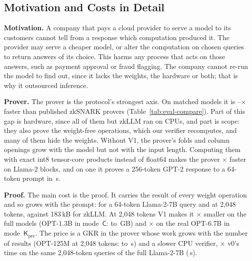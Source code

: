 \providecommand{\para}[1]{\par\noindent\textbf{#1}\quad}
\providecommand{\todo}[1]{\textbf{[TODO: #1]}}
\providecommand{\sC}{\mathsf{C}}
\providecommand{\Kpre}{\mathsf{K}_{\mathrm{pre}}}

\subsection{Motivation and Costs in Detail}
\label{ext:intro-costs}

\para{Motivation.} A company that pays a cloud provider to serve a model to its customers cannot tell
from a response which computation produced it. The provider may serve a cheaper model, or alter
the computation on chosen queries to return answers of its choice. This harms any process that
acts on those answers, such as payment approval or fraud flagging. The company cannot re-run the
model to find out, since it lacks the weights, the hardware or both; that is why it outsourced
inference.

\para{Prover.} The prover is the protocol's strongest axis. On matched models it is
\CompareProverMin{}--\CompareProverMax{}$\times$ faster than published zkSNARK provers
(Table~\ref{tab:eval-compare})\TodoCompareRange{}. Part of this gap is hardware, since all of them
but zkLLM ran on CPUs, and part is scope: they also prove the weight-free operations, which our
verifier recomputes, and many of them hide the weights. Without V1, the prover's folds and column
openings grow with the model but not with the input length. Computing them with exact int8
tensor-core products instead of float64 makes the prover \ImproveOpenRange{}$\times$ faster on
Llama-2 blocks, and on one \PlatformGpu{} it proves a 256-token GPT-2 response to a 64-token prompt
in \GenGptProveC{}\,s.

\para{Proof.} The main cost is the proof. It carries the result of every weight operation and so
grows with the prompt: \ProofLlamaShortC{} for a 64-token Llama-2-7B query and \ProofLlamaLongC{} at
2{,}048 tokens\TodoProofIntro{}, against 183\,kB for zkLLM. At 2{,}048 tokens V1 makes it
\VOneRatioRandom{}$\times$ smaller on the full models (OPT-1.3B in mode~$\sC$: \VOneOptMCVZeroGB{} to
\VOneOptMCVOneGB{}\,GB) and \VOneRatioRealOptLExact{}$\times$ on the real OPT-6.7B in
mode~$\Kpre$. The price is a GKR in the
prover whose work grows with the number of results (OPT-125M at 2{,}048 tokens:
\VOneOptSProveVZero{} to \VOneOptSProveVOne{}\,s) and a slower CPU verifier, \VOneVerifyRatioLlama{}$\times$
v0's time on the same 2{,}048-token queries of the full Llama-2-7B (\VOneVerifyLlama{}\,s)\TodoVOneIntro{}.

